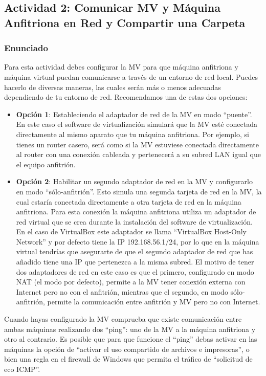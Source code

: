 \subsection{Actividad 2: Comunicar MV y Máquina Anfitriona en Red y Compartir una Carpeta}

\subsubsection{Enunciado}
Para esta actividad debes configurar la MV para que máquina anfitriona y máquina virtual puedan comunicarse a través de un entorno de red local. Puedes hacerlo de diversas maneras, las cuales serán más o menos adecuadas dependiendo de tu entorno de red. Recomendamos una de estas dos opciones:

\begin{itemize}
    \item \textbf{Opción 1}: Estableciendo el adaptador de red de la MV en modo ``puente''. En este caso el software de virtualización simulará que la MV esté conectada directamente al mismo aparato que tu máquina anfitriona. Por ejemplo, si tienes un router casero, será como si la MV estuviese conectada directamente al router con una conexión cableada y pertenecerá a su subred LAN igual que el equipo anfitrión.

    \item \textbf{Opción 2}: Habilitar un segundo adaptador de red en la MV y configurarlo en modo ``sólo-anfitrión''. Esto simula una segunda tarjeta de red en la MV, la cual estaría conectada directamente a otra tarjeta de red en la máquina anfitriona. Para esta conexión la máquina anfitriona utiliza un adaptador de red virtual que se crea durante la instalación del software de virtualización. En el caso de VirtualBox este adaptador se llama ``VirtualBox Host-Only Network'' y por defecto tiene la IP 192.168.56.1/24, por lo que en la máquina virtual tendrías que asegurarte de que el segundo adaptador de red que has añadido tiene una IP que pertenezca a la misma subred. El motivo de tener dos adaptadores de red en este caso es que el primero, configurado en modo NAT (el modo por defecto), permite a la MV tener conexión externa con Internet pero no con el anfitrión, mientras que el segundo, en modo sólo-anfitrión, permite la comunicación entre anfitrión y MV pero no con Internet.
\end{itemize}

Cuando hayas configurado la MV comprueba que existe comunicación entre ambas máquinas realizando dos ``ping'': uno de la MV a la máquina anfitriona y otro al contrario. Es posible que para que funcione el ``ping'' debas activar en las máquinas la opción de ``activar el uso compartido de archivos e impresoras'', o bien una regla en el firewall de Windows que permita el tráfico de ``solicitud de eco ICMP''.

